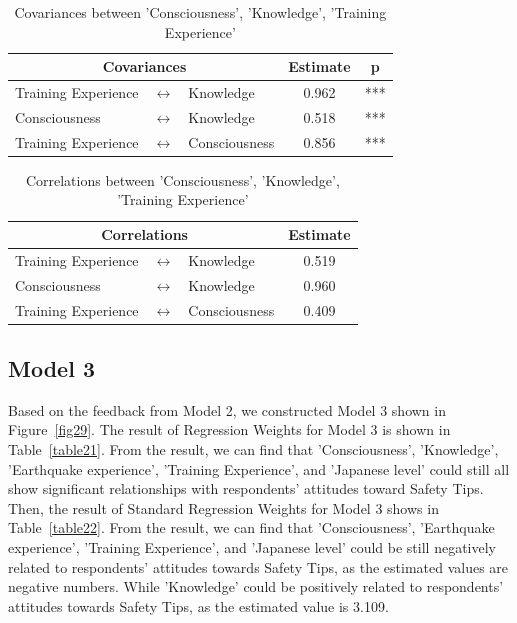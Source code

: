 \begin{table}[h]
  \caption{Covariances between 'Consciousness', 'Knowledge', 'Training Experience'}
  \label{table13}
  \centering
  \begin{tabular}{|l|c|l|c|c|}
  \hline
   \multicolumn{3}{|c|}{Covariances} & Estimate & p \\
  \hline
  Training Experience & $\longleftrightarrow$ & Knowledge & 0.962 & *** \\
  Consciousness & $\longleftrightarrow$ & Knowledge & 0.518 & *** \\
  Training Experience & $\longleftrightarrow$ & Consciousness & 0.856 & *** \\
  \hline
  \end{tabular}
\end{table}

\begin{table}[h]
  \caption{Correlations between 'Consciousness', 'Knowledge', 'Training Experience' }
  \label{table14}
  \centering  \begin{tabular}{|l|c|l|c|}
  \hline
   \multicolumn{3}{|c|}{Correlations} & Estimate \\
  \hline
  Training Experience & $\longleftrightarrow$ & Knowledge & 0.519 \\
  Consciousness & $\longleftrightarrow$ & Knowledge & 0.960 \\
  Training Experience & $\longleftrightarrow$ & Consciousness & 0.409 \\
  \hline
  \end{tabular}
\end{table}

\subsection{Model 3}
Based on the feedback from Model 2, we constructed Model 3 shown in Figure~\ref{fig29}. The result of Regression Weights for Model 3 is shown in Table~\ref{table21}. From the result, we can find that 'Consciousness', 'Knowledge', 'Earthquake experience', 'Training Experience', and 'Japanese level' could still all show significant relationships with respondents' attitudes toward Safety Tips. Then, the result of Standard Regression Weights for Model 3 shows in Table~\ref{table22}. From the result, we can find that 'Consciousness', 'Earthquake experience', 'Training Experience', and 'Japanese level' could be still negatively related to respondents' attitudes towards Safety Tips, as the estimated values are negative numbers. While 'Knowledge' could be positively related to respondents' attitudes towards Safety Tips, as the estimated value is 3.109. 

